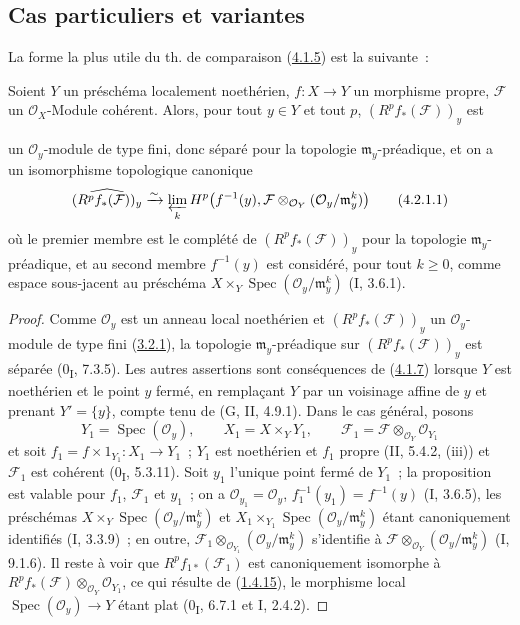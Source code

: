 \subsection{Cas particuliers et variantes}
\label{subsection:III.4.2-fr}

La forme la plus utile du th. de comparaison
(\hyperref[III.4.1.5-fr]{4.1.5}) est la suivante~:

\begin{proposition}[4.2.1]
\label{III.4.2.1-fr}
Soient $Y$ un préschéma localement noethérien, $f:X\to Y$ un morphisme
propre, $\mathcal F$ un $\mathcal O_X$-Module cohérent. Alors, pour tout
$y\in Y$ et tout $p$, $(R^pf_*(\mathcal F))_y$ est


un $\mathcal O_y$-module de type fini, donc séparé pour la topologie
$\mathfrak m_y$-préadique, et on a un isomorphisme topologique canonique
\[
\widehat{(R^pf_*(\mathcal F))_y}
\xrightarrow{\sim}
\varprojlim_kH^p\bigl(f^{-1}(y),
\mathcal F\otimes_{\mathcal O_Y}(\mathcal O_y/\mathfrak m_y^k)\bigr)
\tag{4.2.1.1}\label{III.4.2.1.1-fr}
\]
où le premier membre est le complété de $(R^pf_*(\mathcal F))_y$ pour la
topologie $\mathfrak m_y$-préadique, et au second membre $f^{-1}(y)$ est
considéré, pour tout $k\geq0$, comme espace sous-jacent au préschéma
$X\times_Y\operatorname{Spec}(\mathcal O_y/\mathfrak m_y^k)$
(I, 3.6.1).
\end{proposition}

\begin{proof}
Comme $\mathcal O_y$ est un anneau local noethérien et
$(R^pf_*(\mathcal F))_y$ un $\mathcal O_y$-module de type fini
(\hyperref[III.3.2.1-fr]{3.2.1}), la topologie $\mathfrak m_y$-préadique
sur $(R^pf_*(\mathcal F))_y$ est séparée (0\textsubscript{I}, 7.3.5). Les
autres assertions sont conséquences de (\hyperref[III.4.1.7-fr]{4.1.7})
lorsque $Y$ est noethérien et le point $y$ fermé, en remplaçant $Y$ par un
voisinage affine de $y$ et prenant $Y'=\{y\}$, compte tenu de
(G, II, 4.9.1). Dans le cas général, posons
\[
Y_1=\operatorname{Spec}(\mathcal O_y),\qquad
X_1=X\times_YY_1,\qquad
\mathcal F_1=\mathcal F\otimes_{\mathcal O_Y}\mathcal O_{Y_1}
\]
et soit $f_1=f\times1_{Y_1}:X_1\to Y_1$~; $Y_1$ est noethérien et $f_1$
propre (II, 5.4.2, (iii)) et $\mathcal F_1$ est cohérent
(0\textsubscript{I}, 5.3.11). Soit $y_1$ l'unique point fermé de $Y_1$~;
la proposition est valable pour $f_1$, $\mathcal F_1$ et $y_1$~; on a
$\mathcal O_{y_1}=\mathcal O_y$, $f_1^{-1}(y_1)=f^{-1}(y)$ (I, 3.6.5),
les préschémas
$X\times_Y\operatorname{Spec}(\mathcal O_y/\mathfrak m_y^k)$ et
$X_1\times_{Y_1}\operatorname{Spec}(\mathcal O_y/\mathfrak m_y^k)$ étant
canoniquement identifiés (I, 3.3.9)~; en outre,
$\mathcal F_1\otimes_{\mathcal O_{Y_1}}
(\mathcal O_y/\mathfrak m_y^k)$ s'identifie à
$\mathcal F\otimes_{\mathcal O_Y}(\mathcal O_y/\mathfrak m_y^k)$
(I, 9.1.6). Il reste à voir que $R^pf_{1*}(\mathcal F_1)$ est
canoniquement isomorphe à
$R^pf_*(\mathcal F)\otimes_{\mathcal O_Y}\mathcal O_{Y_1}$, ce qui
résulte de (\hyperref[III.1.4.15-fr]{1.4.15}), le morphisme local
$\operatorname{Spec}(\mathcal O_y)\to Y$ étant plat
(0\textsubscript{I}, 6.7.1 et I, 2.4.2).
\end{proof}

